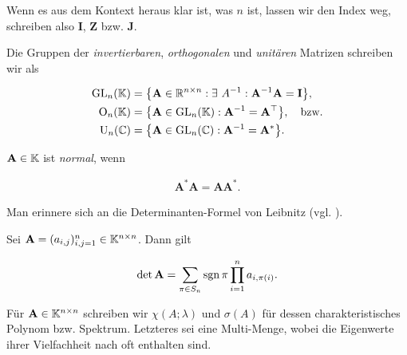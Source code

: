             Wenn es aus dem Kontext heraus klar ist, was $n$ ist, lassen wir den Index weg, schreiben also $\mathbf I$, $\mathbf Z$ bzw. $\mathbf J$.

            Die Gruppen der \textit{invertierbaren}, \textit{orthogonalen} und \textit{unitären} Matrizen schreiben wir als

            \begin{align*}
                \operatorname{GL}_n(\mathbb K) & = {\left \{ \mathbf A \in \mathbb R^{n \times n}: \exists ~ A^{-1}: \mathbf A^{-1} \mathbf A = \mathbf I \right \}}, \\
                \operatorname O_n(\mathbb K)   & = {\left \{ \mathbf A \in \operatorname{GL}_n(\mathbb K): \mathbf A^{-1} = \mathbf A^\top \right \}},
                \quad
                \text{bzw.} \\
                \operatorname U_n(\mathbb C)   & = {\left \{ \mathbf A \in \operatorname{GL}_n(\mathbb C): \mathbf A^{-1} = \mathbf A^\ast \right \}}.
            \end{align*}

            $\mathbf A \in \mathbb K$ ist \textit{normal}, wenn

            \begin{align*}
                \mathbf A^\ast \mathbf A
                =
                \mathbf A \mathbf A^\ast.
            \end{align*}

            Man erinnere sich an die Determinanten-Formel von Leibnitz (vgl. \cite[Kapitel 7.1]{LinAG1&2}).

            \begin{lemma} \label{lem:leibnitz}

                Sei $\mathbf A = (a_{i,j})_{i,j=1}^n \in \mathbb K^{n \times n}$.
                Dann gilt

                \begin{align*}
                    \det \mathbf A
                    =
                    \sum_{\pi \in S_n}
                        \operatorname{sgn} \pi
                        \prod_{i=1}^n
                            a_{i, \pi(i)}.
                \end{align*}

            \end{lemma}

            Für $\mathbf A \in \mathbb K^{n \times n}$ schreiben wir $\chi(A; \lambda)$ und $\sigma(A)$ für dessen charakteristisches Polynom bzw. Spektrum.
            Letzteres sei eine Multi-Menge, wobei die Eigenwerte ihrer Vielfachheit nach oft enthalten sind.

